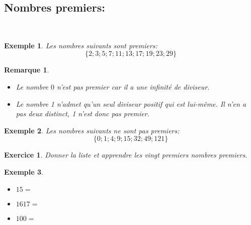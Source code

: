 \documentclass[a4paper,10.5pt]{article}
\newtheorem{defi}{Définition}
\newtheorem{thm}{Théorème}
\newtheorem{rmq}{Remarque}
\newtheorem{ex}{Exemple}
\newtheorem{exer}{Exercice}
\begin{document}
\subsection{Nombres premiers:}
\quad\\[1mm]
\noindent{}


\begin{ex}
	Les nombres suivants sont premiers:
	$$\{2; 3; 5; 7; 11; 13; 17; 19; 23; 29\}$$
	
\end{ex}
\begin{rmq}\hfill\\[-0.25cm]

	\begin{itemize}[$\square$]
		\item Le nombre $0$ n'est pas premier car il a une infinité de diviseur.
		\item Le nombre 1 n'admet qu'un seul diviseur positif qui est lui-même. Il n'en a pas deux distinct, 1 n'est donc pas premier.   
	\end{itemize}
\end{rmq}
\begin{ex}
	Les nombres suivants ne sont pas premiers:
	$$\{0; 1; 4; 9; 15; 32; 49; 121\}$$	
\end{ex}
\begin{exer}
	Donner la liste et apprendre les vingt premiers nombres premiers.
\end{exer}
\noindent{}

\begin{ex}\hfill\\
		\begin{multicols}{3}
		\begin{itemize}[$\square$]
			\item $15 = $\\
			\item $1617 =$\\
			\item $100 =$\\
		\end{itemize}
	\end{multicols}

\end{ex}
\end{document}
